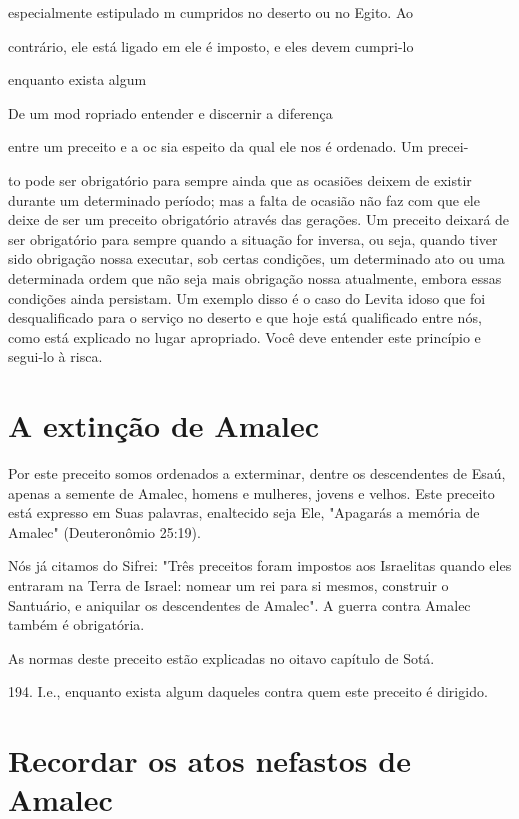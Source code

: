\begin{itemize}
\begin{enumrate}
\begin{itemize}
\begin{itemize}
\begin{itemize}
especialmente estipulado m cumpridos no deserto ou no Egito. Ao

contrário, ele está ligado em ele é imposto, e eles devem cumpri-lo

enquanto exista algum

De um mod ropriado entender e discernir a diferença

entre um preceito e a oc sia espeito da qual ele nos é ordenado. Um
precei-

to pode ser obrigatório para sempre ainda que as ocasiões deixem de
existir durante um determinado período; mas a falta de ocasião não faz
com que ele deixe de ser um preceito obrigatório através das gerações.
Um preceito deixará de ser obrigatório para sempre quando a situação for
inversa, ou seja, quando tiver sido obrigação nossa executar, sob certas
condições, um determinado ato ou uma determinada ordem que não seja mais
obrigação nossa atualmente, em­bora essas condições ainda persistam. Um
exemplo disso é o caso do Levita idoso que foi desqualificado para o
serviço no deserto e que hoje está qualifica­do entre nós, como está
explicado no lugar apropriado. Você deve entender este princípio e
segui-lo à risca.

\section{A extinção de Amalec}

Por este preceito somos ordenados a exterminar, dentre os descen­dentes
de Esaú, apenas a semente de Amalec, homens e mulheres, jovens e
ve­lhos. Este preceito está expresso em Suas palavras, enaltecido seja
Ele, "Apaga­rás a memória de Amalec" (Deuteronômio 25:19).

Nós já citamos do Sifrei: "Três preceitos foram impostos aos Israeli­tas
quando eles entraram na Terra de Israel: nomear um rei para si mesmos,
construir o Santuário, e aniquilar os descendentes de Amalec". A guerra
contra Amalec também é obrigatória.


As normas deste preceito estão explicadas no oitavo capítulo de Sotá.


194. I.e., enquanto exista algum daqueles contra quem este preceito é
dirigido.



\section{Recordar os atos nefastos de Amalec}


\end{itemize}
\end{itemize}
\end{itemize}
\end{enumrate}
\end{itemize}
